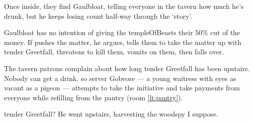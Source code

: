 \documentclass[10pt,twoside]{book}
\begin{document}

Once inside, they find Gaulbloat, telling everyone in the tavern how much he's drunk, but he keeps losing count half-way through the `story'.

Gaulbloat has no intention of giving the \gls{templeOfBeasts} their 50\% cut of the money.
If  pushes the matter, he argues, tells them to take the matter up with \gls{tender} Greetfall, threatens to kill them, vomits on them, then falls over.

The tavern patrons complain about how long \gls{tender} Greetfall has been upstairs.
Nobody can get a drink, so \gls{server} Gobvore --- a young waitress with eyes as vacant as a pigeon --- attempts to take the initiative and take payments from everyone while refilling from the pantry (room \vref{lt:pantry}).

\begin{speechtext}
  \Gls{tender} Greetfall?
  He went upstairs, \gls{harvesting} the \gls{woodspy} I suppose.
\end{speechtext}

\end{document}
